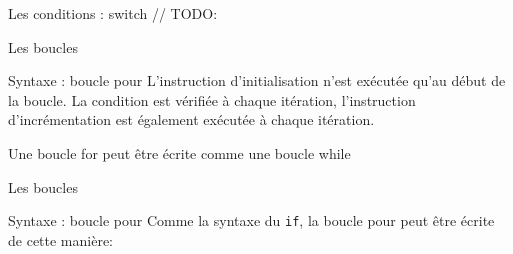 	\begin{frame}{Les conditions : switch}
		// TODO:
	\end{frame}



	\begin{frame}{Les boucles}	
		\begin{block}{Syntaxe : boucle pour}
			\forsyntax
			L'instruction \alert{d'initialisation } n'est exécutée qu'au début de la boucle. La \alert{condition} est vérifiée à chaque itération, \alert{l'instruction d'incrémentation} est également exécutée à chaque itération.
		\end{block}
		\begin{alertblock}{Une boucle for peut être écrite comme une boucle while}
			\forWrittenUsingWhile
		\end{alertblock}
	\end{frame}



	\begin{frame}{Les boucles}
		\begin{block}{Syntaxe : boucle pour}
			Comme la syntaxe du \texttt{if}, la boucle pour peut être écrite de cette manière:
			\forsyntaxtwo
		\end{block}
		\begin{center}
			\begin{minipage}[t]{0.48\linewidth}
				\forExmpOne
			\end{minipage}
			\begin{minipage}[t]{0.48\linewidth}
				\forExmpTwo
			\end{minipage}
		\end{center}
	\end{frame}
	

